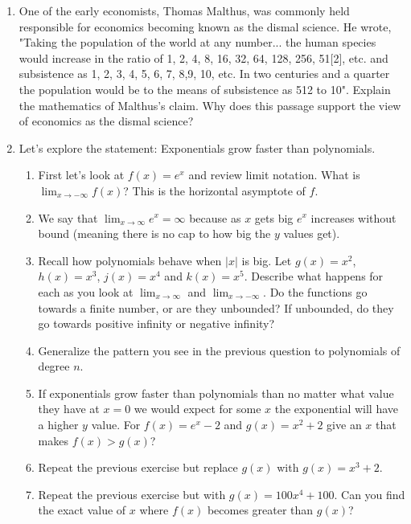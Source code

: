\documentclass[12pt]{article}
\theoremstyle{plain}     %
\begin{document}
\begin{enumerate}
		\item One of the early economists, Thomas Malthus, was commonly held responsible for economics becoming known as the dismal science. He wrote, "Taking the population of the world at any number... the human species would increase in the ratio of 1, 2, 4, 8, 16, 32, 64, 128, 256, 51[2], etc. and subsistence as 1, 2, 3, 4, 5, 6, 7, 8,9, 10, etc. In two centuries and a quarter the population would be to the means of subsistence as 512 to 10". Explain the mathematics of Malthus's claim. Why does this passage support the view of economics as the dismal science?

		\item \hspace{-2em}\llap{$*$}\hspace{2em} Let's explore the statement: Exponentials grow faster than polynomials.
			\begin{enumerate}
				\item First let's look at $f(x)=e^x$ and review limit notation. What is $\displaystyle \lim_{x\to -\infty} f(x)$? This is the horizontal asymptote of $f$.
				\item We say that $\displaystyle \lim_{x\to \infty} e^x =\infty$ because as $x$ gets big $e^x$ increases without bound (meaning there is no cap to how big the $y$ values get).
				\item Recall how polynomials behave when $|x|$ is big. Let $g(x)=x^2$, $h(x)=x^3$, $j(x)=x^4$ and $k(x)=x^5$. Describe what happens for each as you look at $\lim_{x\to \infty}$ and $\lim_{x\to -\infty}$. Do the functions go towards a finite number, or are they unbounded? If unbounded, do they go towards positive infinity or negative infinity?
				\item Generalize the pattern you see in the previous question to polynomials of degree $n$.
				\item If exponentials grow faster than polynomials than no matter what value they have at $x=0$ we would expect for some $x$ the exponential will have a higher $y$ value. For $f(x)=e^x-2$ and $g(x)=x^2+2$ give an $x$ that makes $f(x)>g(x)$?
				\item Repeat the previous exercise but replace $g(x)$ with $g(x)=x^3+2$.
				\item Repeat the previous exercise but with $g(x)=100x^4+100$. Can you find the exact value of $x$ where $f(x)$ becomes greater than $g(x)$?
			\end{enumerate}					

\end{enumerate}
\end{document}
